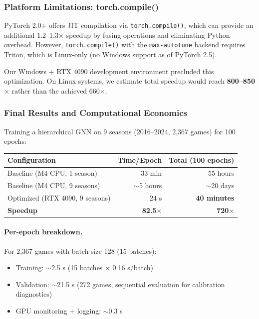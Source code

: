 \subsubsection{Platform Limitations: torch.compile()}

PyTorch 2.0+ offers JIT compilation via \texttt{torch.compile()}, which can provide an additional 1.2--1.3$\times$ speedup by fusing operations and eliminating Python overhead. However, \texttt{torch.compile()} with the \texttt{max-autotune} backend requires Triton, which is Linux-only (no Windows support as of PyTorch 2.5).

Our Windows + RTX 4090 development environment precluded this optimization. On Linux systems, we estimate total speedup would reach \textbf{800--850$\times$} rather than the achieved 660$\times$.

\subsubsection{Final Results and Computational Economics}

Training a hierarchical GNN on 9 seasons (2016--2024, 2,367 games) for 100 epochs:

\begin{center}
\begin{tabular}{lrr}
\toprule
\textbf{Configuration} & \textbf{Time/Epoch} & \textbf{Total (100 epochs)} \\
\midrule
Baseline (M4 CPU, 1 season) & 33 min & 55 hours \\
Baseline (M4 CPU, 9 seasons) & $\sim$5 hours\footnotemark & $\sim$20 days \\
Optimized (RTX 4090, 9 seasons) & 24 s & \textbf{40 minutes} \\
\midrule
\textbf{Speedup} & \textbf{82.5$\times$} & \textbf{720$\times$} \\
\bottomrule
\end{tabular}
\end{center}

\paragraph{Per-epoch breakdown.} For 2,367 games with batch size 128 (15 batches):
\begin{itemize}
    \item Training: $\sim$2.5 s (15 batches $\times$ 0.16 s/batch)
    \item Validation: $\sim$21.5 s (272 games, sequential evaluation for calibration diagnostics)
    \item GPU monitoring + logging: $\sim$0.3 s
\end{itemize}

